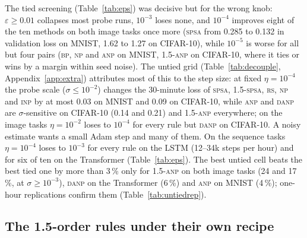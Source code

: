 \documentclass{article}
\newcommand{\method}[1]{\textsc{#1}}
\newcommand{\BP}{\method{bp}}
\newcommand{\SPSA}{\method{spsa}}
\newcommand{\SPSAb}{\method{1.5-spsa}}
\newcommand{\RS}{\method{rs}}
\newcommand{\NP}{\method{np}}
\newcommand{\ANP}{\method{anp}}
\newcommand{\ANPb}{\method{1.5-anp}}
\newcommand{\INP}{\method{inp}}
\newcommand{\DANP}{\method{danp}}
\begin{document}
The tied screening (Table~\ref{tab:eps}) was decisive but for the wrong knob:
$\varepsilon\ge0.01$ collapses most probe runs, $10^{-3}$ loses none, and $10^{-4}$
improves eight of the ten methods on both image tasks once more (\SPSA{} from 0.285 to
0.132 in validation loss on MNIST, 1.62 to 1.27 on CIFAR-10), while $10^{-5}$ is worse for all but four pairs (\BP{}, \NP{} and \ANP{} on MNIST,
\ANPb{} on CIFAR-10, where it ties or wins by a margin within seed noise). The untied grid (Table~\ref{tab:decouple}, Appendix~\ref{app:extra}) attributes most
of this to the step size: at fixed $\eta=10^{-4}$ the probe scale ($\sigma\le10^{-2}$) changes the
30-minute loss of \SPSA{}, \SPSAb{}, \RS{}, \NP{} and \INP{} by at most 0.03 on
MNIST and 0.09 on CIFAR-10, while \ANP{} and \DANP{} are $\sigma$-sensitive on
CIFAR-10 (0.14 and 0.21) and \ANPb{} everywhere; on the image tasks $\eta=10^{-2}$
loses to $10^{-4}$ for every rule but \DANP{} on CIFAR-10. A noisy estimate wants a small Adam step and many of them. On the sequence tasks $\eta=10^{-4}$ loses to $10^{-3}$ for every
rule on the LSTM (12--34k steps per hour) and for
six of ten on the Transformer (Table~\ref{tab:eps}). The best untied cell beats the best tied one by more than 3\,\% only for \ANPb{}
on both image tasks (24 and 17\,\%, at $\sigma\ge10^{-3}$), \DANP{} on the Transformer
(6\,\%) and \ANP{} on MNIST (4\,\%); one-hour replications confirm them (Table~\ref{tab:untiedrep}).

\subsection{The 1.5-order rules under their own recipe}
\label{sec:own}
\end{document}
